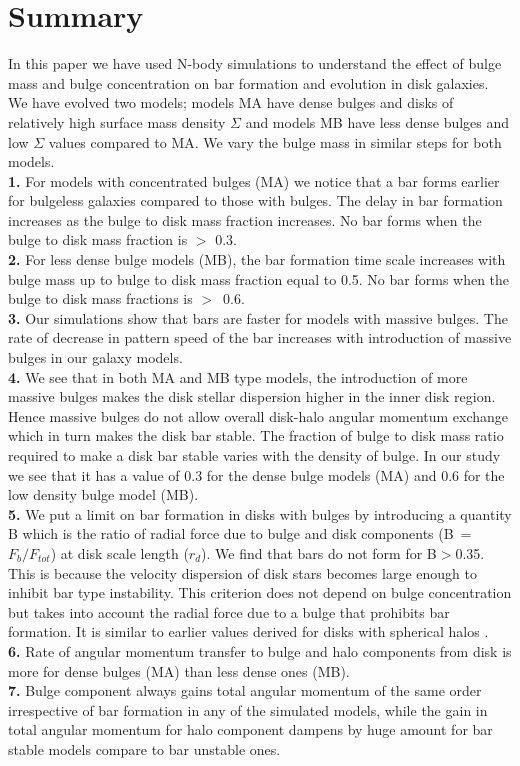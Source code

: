 \documentclass[a4paper,fleqn,usenatbib,useAMS]{mnras}
\begin{document}
\section{Summary}\label{summary}
In this paper we have used N-body simulations to understand the effect of bulge mass and bulge concentration on bar formation and evolution in disk galaxies. We have evolved two models; models MA have dense bulges and disks of relatively high surface mass density $\Sigma$ and models MB have less dense bulges and low $\Sigma$ values compared to MA. We vary the bulge mass in similar steps for both models.\\
{\bf 1.} For models with concentrated bulges (MA) we notice that a bar forms earlier for bulgeless galaxies compared to those with bulges. The delay in bar formation increases as the bulge to disk mass fraction  increases. No bar forms when the bulge to disk mass fraction is $>$ 0.3.\\
 {\bf 2.} For less dense bulge models (MB), the bar formation time scale increases with bulge mass up to bulge to disk mass fraction equal to 0.5. No bar forms when the bulge to disk mass fractions is $>$~0.6.
 \\ {\bf 3.} Our simulations show that bars are faster for models with massive bulges. The rate of decrease in pattern speed of the bar increases with introduction of massive bulges in our galaxy models.\\  
{\bf 4.} We see that in both MA and MB type models, the introduction of more massive bulges makes the disk stellar dispersion higher in the inner disk region. Hence massive bulges do not allow overall disk-halo angular momentum exchange which in turn makes the disk bar stable. The fraction of bulge to disk mass ratio required to make a disk bar stable varies with the density of bulge. In our study we see that it has a value of 0.3 for the dense bulge models (MA) and 0.6 for the low density bulge model (MB).\\
 {\bf 5.} We put a limit on bar formation in disks with bulges by introducing a quantity B which is the ratio of radial force due to bulge and disk components (B~=~$F_{b}/F_{tot}$) at disk scale length ($r_{d}$). We find that bars do not form for B$>$0.35. This is because the velocity dispersion of disk stars becomes large enough to inhibit bar type instability. This criterion does not depend on bulge concentration but takes into account the radial force due to a bulge that prohibits bar formation. It is similar to earlier values derived for disks with spherical halos  \citep{46}.\\ 
{\bf 6.} Rate of angular momentum transfer to bulge and halo components from disk is more for dense bulges (MA) than less dense ones (MB). \\
{\bf 7.} Bulge component always gains total angular momentum of the same order irrespective of bar formation in any of the simulated models, while the gain in total angular momentum for halo component dampens by huge amount for bar stable models compare to bar unstable ones. 
\end{document}
